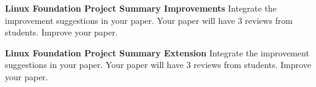 \begin{exercise} {\bf Linux Foundation Project Summary Improvements}
Integrate the improvement suggestions in your paper. Your paper will
have 3 reviews from students. Improve your paper.
\end{exercise} 

\begin{exercise} {\bf Linux Foundation Project Summary Extension}
Integrate the improvement suggestions in your paper. Your paper will
have 3 reviews from students. Improve your paper.
\end{exercise} 

